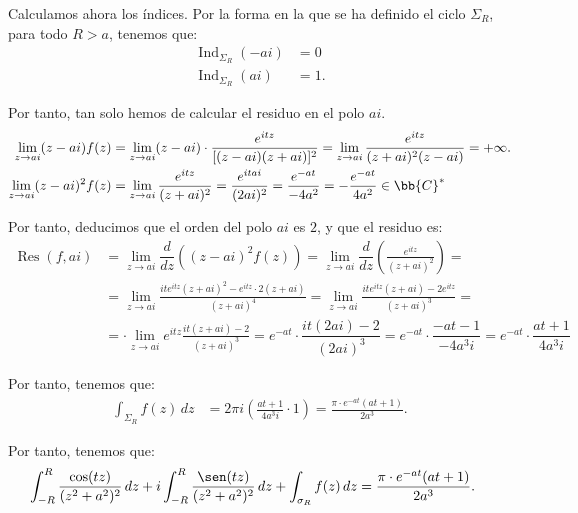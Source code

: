 \documentclass[12pt]{article}
\DeclareMathOperator{\Ind}{Ind}
\DeclareMathOperator{\Res}{Res}
\begin{document}
\begin{ejercicio}[2.5 puntos]
        Calculamos ahora los índices. Por la forma en la que se ha definido el ciclo $\Sigma_R$, para todo $R > a$, tenemos que:
        \begin{align*}
            \Ind_{\Sigma_R}(-ai) &= 0\\
            \Ind_{\Sigma_R}(ai) &= 1.
        \end{align*}

        Por tanto, tan solo hemos de calcular el residuo en el polo $ai$.
        \begin{align*}
            \lim_{z\to ai} (z - ai)f(z) &= \lim_{z\to ai} (z - ai)\cdot \frac{e^{i t z}}{[(z - ai)(z + ai)]^2}
            = \lim_{z\to ai} \frac{e^{i t z}}{(z + ai)^2(z - ai)} = +\infty.\\
            \lim_{z\to ai} (z - ai)^2f(z) &= \lim_{z\to ai} \frac{e^{i t z}}{(z + ai)^2}
            = \frac{e^{i t ai}}{(2ai)^2} = \frac{e^{-at}}{-4a^2} = -\frac{e^{-at}}{4a^2}\in \bb{C}^*
        \end{align*}

        Por tanto, deducimos que el orden del polo $ai$ es $2$, y que el residuo es:
        \begin{align*}
            \Res(f, ai) &= \lim_{z\to ai} \dfrac{d}{dz}\left((z - ai)^2f(z)\right)
            = \lim_{z\to ai} \dfrac{d}{dz}\left(\frac{e^{i t z}}{(z + ai)^2}\right)
            =\\&= \lim_{z\to ai} \frac{i t e^{i t z}(z + ai)^2 - e^{i t z}\cdot 2(z + ai)}{(z + ai)^4}
            = \lim_{z\to ai} \frac{i t e^{i t z}(z + ai) - 2e^{i t z}}{(z + ai)^3}
            =\\&= \cdot \lim_{z\to ai} e^{i t z} \frac{i t (z + ai) - 2}{(z + ai)^3}
            = e^{-at}\cdot \dfrac{i t (2ai) - 2}{(2ai)^3}
            = e^{-at}\cdot \dfrac{-at -1}{-4a^3i}
            = e^{-at}\cdot \dfrac{at+1}{4a^3i}
        \end{align*}

        Por tanto, tenemos que:
        \begin{align*}
            \int_{\Sigma_R} f(z) \, dz &= 2\pi i\left(\frac{at + 1}{4a^3i} \cdot 1\right)
            = \frac{\pi\cdot e^{-at}(at + 1)}{2a^3}.
        \end{align*}

        Por tanto, tenemos que:
        \begin{align*}
            \int_{-R}^{R} \frac{\cos(t z)}{(z^2 + a^2)^2} \, dz + i\int_{-R}^{R} \frac{\sen(t z)}{(z^2 + a^2)^2} \, dz + \int_{\sigma_R} f(z) \, dz &= \frac{\pi\cdot e^{-at}(at + 1)}{2a^3}.
        \end{align*}


\end{ejercicio}
\end{document}
